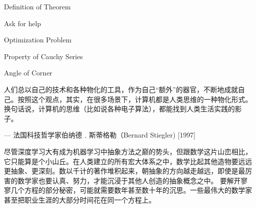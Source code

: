  \begin{introduction}
  \item Definition of Theorem
  \item Ask for help
  \item Optimization Problem
  \item Property of Cauchy Series
  \item Angle of Corner
\end{introduction}


人们总以自己的技术和各种物化的工具，作为自己“额外”的器官，不断地成就自己。按照这个观点，其实，在很多场景下，计算机都是人类思维的一种物化形式。换句话说，计算机的思维（比如说各种电子算法），都能找到人类生活实践的影子。

\begin{flushright}
— 法国科技哲学家伯纳德﹒斯蒂格勒（Bernard Stiegler)  [1997]
\end{flushright}




尽管深度学习大有成为机器学习中抽象方法之巅的势头，但跟数学这片山峦相比，它只能算是个小山丘。在人类建立的所有宏大体系之中，数学比起其他造物要远远更抽象、更深刻。数以千计的著作堆积起来，朝抽象的方向越走越远，即使是最厉害的数学家也要认真、努力，才能沉浸于其他人创造的抽象概念之中。
要解开寥寥几个方程的部分秘密，可能就需要数年甚至数十年的沉思。一些最伟大的数学家甚至把职业生涯的大部分时间花在同一个方程上。


